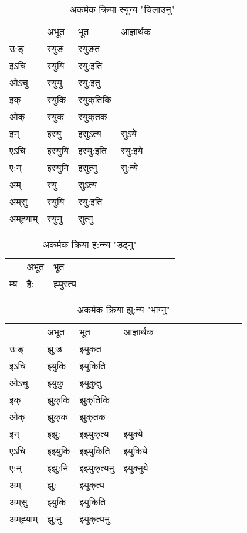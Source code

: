 \begin{table}[H]
\centering
\caption{\label{u.vi} अकर्मक क्रिया  स्युन्य  "चिलाउनु"  }
\begin{tabular}{l|l|l|l|l|l|l|l|l|l|l|l|l}  \toprule
&अभूत & भूत & आज्ञार्थक \\ 
उ:ङ्‌ &स्युङ &स्युङत \\ 
इऽचि &स्युयि &स्यु:इति   \\ 
ओऽचु &स्युयु &स्यु:इतु   \\ 
इक् &स्युकि &स्युक्‌तिकि   \\ 
ओक् &स्युक &स्युक्‌तक   \\ 
इन् & इस्यु & इसुऽत्य &सुऽये  \\ 
एऽचि & इस्युयि & इस्यु:इति &स्यु:इये    \\ 
ए:न् & इस्युनि  & इसुत्‍नु &सु:न्ये  \\ 
अम् & स्यु & सुऽत्य   \\ 
अम्‌सु & स्युयि & स्यु:इति     \\ 
अम्‌ह्‍याम् & स्युनु  & सुत्‍नु \\ 
\bottomrule
\end{tabular}
\end{table}


\begin{table}[H]
\centering
\caption{\label{ut.vi} अकर्मक क्रिया  ह:न्‍न्य  "डढ्नु"  }
\begin{tabular}{l|l|l|l|l|l|l|l|l|l|l|l|l}  \toprule
&अभूत & भूत   \\ 
म्य & है: & ह्‍युस्त्य   \\ 
\bottomrule
\end{tabular}
\end{table}


\begin{table}[H]
\centering
\caption{\label{uk.vi} अकर्मक क्रिया  झु:न्य  "भाग्नु"  }
\begin{tabular}{l|l|l|l|l|l|l|l|l|l|l|l|l}  \toprule
&अभूत & भूत & आज्ञार्थक \\ 
उ:ङ्‌ &झु:ङ &झ्युकत \\ 
इऽचि &झ्युकि &झ्युकिति   \\ 
ओऽचु &झ्युकु &झ्युकुतु   \\ 
इक् &झुक्‌कि &झुक्‌तिकि   \\ 
ओक् &झुक्‌क &झुक्‌तक   \\ 
इन् & इझु: & इझ्युक्‌त्य &झ्युक्ये  \\ 
एऽचि & इझ्युकि & इझ्युकिति &झ्युकिये    \\ 
ए:न् & इझु:नि  & इझ्युक्‌त्यनु &झ्युक्‍नुये  \\ 
अम् & झु: & झ्युक्‌त्य   \\ 
अम्‌सु & झ्युकि & झ्युकिति   \\ 
अम्‌ह्‍याम् & झु:नु  & झ्युक्‌त्यनु \\ 
\bottomrule
\end{tabular}
\end{table}


